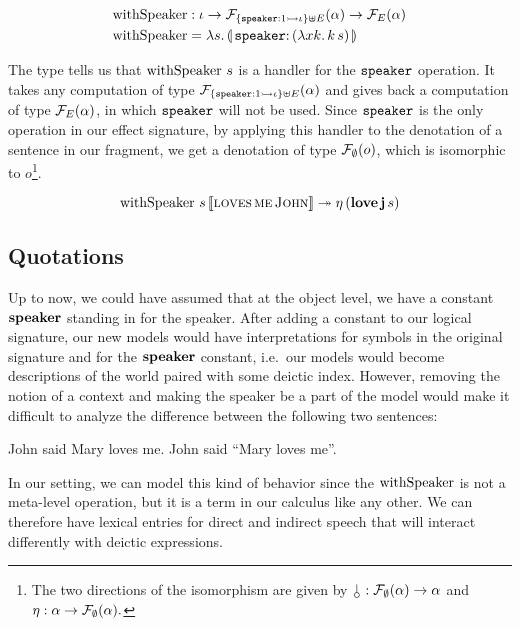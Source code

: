 \begin{align*}
  \withSpeaker &: \iota \to \FF_{\{\typedop{speaker}{1}{\iota}\} \uplus E}(\alpha) \to \FF_E(\alpha) \\
  \withSpeaker &= \lam{s}{\banana{\onto{\op{speaker}}{(\lam{x k}{\ap{k}{s}})}}}
\end{align*}

The type tells us that $\operatorname{withSpeaker}\,s$ is a handler for the
$\mathtt{speaker}$ operation. It takes any computation of type
$\mathcal{F}_{\{\mathtt{speaker} : 1 \rightarrowtail \iota\} \uplus E}(\alpha)$ and gives back a
computation of type $\mathcal{F}_E(\alpha)$, in which $\mathtt{speaker}$ will not be
used. Since $\mathtt{speaker}$ is the only operation in our effect signature,
by applying this handler to the denotation of a sentence in our fragment,
we get a denotation of type $\mathcal{F}_\emptyset(o)$, which is isomorphic to
$o$\footnote{The two directions of the isomorphism are given by
  $\cherry : \FF_\emptyset(\alpha) \to \alpha$ and
  $\eta : \alpha \to \mathcal{F}_\emptyset(\alpha).$}.

$$
  \operatorname{withSpeaker}\,s\,\llbracket \textsc{loves}\,\textsc{me}\,\textsc{John} \rrbracket \twoheadrightarrow
  \eta\,(\textbf{love}\,\textbf{j}\,s)
$$


\subsection{Quotations}

Up to now, we could have assumed that at the object level, we have a
constant $\textbf{speaker}$ standing in for the speaker. After adding a
constant to our logical signature, our new models would have
interpretations for symbols in the original signature and for the
$\textbf{speaker}$ constant, i.e.\ our models would become descriptions of the
world paired with some deictic index. However, removing the notion of a
context and making the speaker be a part of the model would make it
difficult to analyze the difference between the following two sentences:

\begin{exe}
  \ex John said Mary loves me. \label{ex:indirect-speech}
  \ex John said ``Mary loves me''. \label{ex:direct-speech}
\end{exe}

In our setting, we can model this kind of behavior since the $\operatorname{withSpeaker}$
is not a meta-level operation, but it is a term in our calculus like any
other. We can therefore have lexical entries for direct and indirect speech
that will interact differently with deictic expressions.

